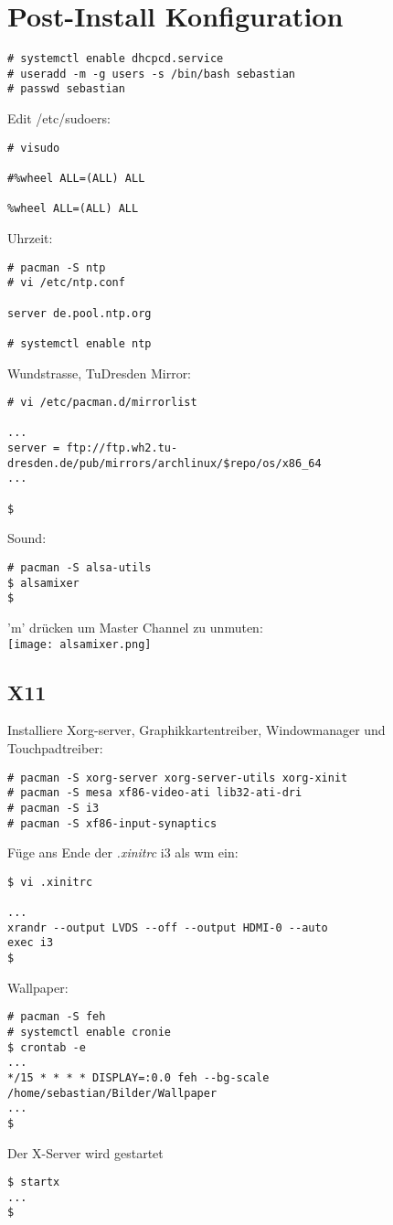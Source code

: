 \section{Post-Install Konfiguration}
\begin{lstlisting}[style=Bash]
# systemctl enable dhcpcd.service 
# useradd -m -g users -s /bin/bash sebastian 
# passwd sebastian
\end{lstlisting}
Edit /etc/sudoers:
\begin{lstlisting}[style=Bash]
# visudo 

#%wheel ALL=(ALL) ALL

%wheel ALL=(ALL) ALL
\end{lstlisting}
Uhrzeit:
\begin{lstlisting}[style=Bash]
# pacman -S ntp 
# vi /etc/ntp.conf

server de.pool.ntp.org

# systemctl enable ntp 
\end{lstlisting}
Wundstrasse, TuDresden Mirror:
\begin{lstlisting}[style=Bash]
# vi /etc/pacman.d/mirrorlist

...
server = ftp://ftp.wh2.tu-dresden.de/pub/mirrors/archlinux/$repo/os/x86_64
...

$
\end{lstlisting}
Sound:
\begin{lstlisting}[style=Bash]
# pacman -S alsa-utils 
$ alsamixer
$
\end{lstlisting}
'm' drücken um Master Channel zu unmuten:\\
\texttt{[image: alsamixer.png]}

\subsection{X11}
\label{sec:x11}
Installiere Xorg-server, Graphikkartentreiber, Windowmanager und Touchpadtreiber:
\begin{lstlisting}[style=Bash]
# pacman -S xorg-server xorg-server-utils xorg-xinit 
# pacman -S mesa xf86-video-ati lib32-ati-dri
# pacman -S i3
# pacman -S xf86-input-synaptics
\end{lstlisting}
Füge ans Ende der \emph{.xinitrc} i3 als wm ein:
\begin{lstlisting}[style=Bash]
$ vi .xinitrc 

...
xrandr --output LVDS --off --output HDMI-0 --auto
exec i3
$
\end{lstlisting}
Wallpaper: 
\begin{lstlisting}[style=Bash]
# pacman -S feh
# systemctl enable cronie
$ crontab -e
...
*/15 * * * * DISPLAY=:0.0 feh --bg-scale /home/sebastian/Bilder/Wallpaper
...
$
\end{lstlisting}
Der X-Server wird gestartet
\begin{lstlisting}[style=Bash]
$ startx
...
$
\end{lstlisting}

